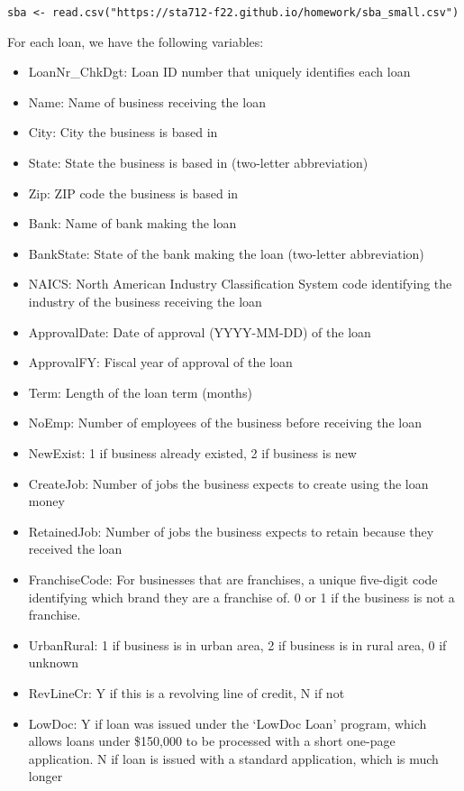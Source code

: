 \documentclass[11pt]{article}
\begin{document}
\begin{verbatim}
sba <- read.csv("https://sta712-f22.github.io/homework/sba_small.csv")
\end{verbatim}


\noindent For each loan, we have the following variables:

\begin{itemize}
\item LoanNr\_ChkDgt:	Loan ID number that uniquely identifies each loan
\item Name: 	Name of business receiving the loan
\item City: 	City the business is based in
\item State: 	State the business is based in (two-letter abbreviation)
\item Zip: 	ZIP code the business is based in
\item Bank: 	Name of bank making the loan
\item BankState: 	State of the bank making the loan (two-letter abbreviation)
\item NAICS: 	North American Industry Classification System code identifying the industry of the business receiving the loan
\item ApprovalDate: 	Date of approval (YYYY-MM-DD) of the loan
\item ApprovalFY: 	Fiscal year of approval of the loan
\item Term: 	Length of the loan term (months)
\item NoEmp: 	Number of employees of the business before receiving the loan
\item NewExist: 	1 if business already existed, 2 if business is new
\item CreateJob: 	Number of jobs the business expects to create using the loan money
\item RetainedJob: 	Number of jobs the business expects to retain because they received the loan
\item FranchiseCode: 	For businesses that are franchises, a unique five-digit code identifying which brand they are a franchise of. 0 or 1 if the business is not a franchise.
\item UrbanRural: 	1 if business is in urban area, 2 if business is in rural area, 0 if unknown
\item RevLineCr: 	Y if this is a revolving line of credit, N if not
\item LowDoc: 	Y if loan was issued under the `LowDoc Loan' program, which allows loans under \$150,000 to be processed with a short one-page application. N if loan is issued with a standard application, which is much longer

\end{itemize}
\end{document}
